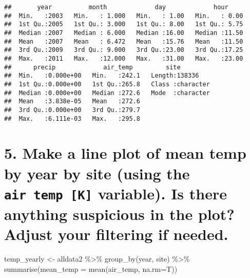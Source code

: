 \documentclass[
]{book}
\newenvironment{Shaded}{\begin{snugshade}}{\end{snugshade}}
\newcommand{\AttributeTok}[1]{\textcolor[rgb]{0.77,0.63,0.00}{#1}}
\newcommand{\FunctionTok}[1]{\textcolor[rgb]{0.00,0.00,0.00}{#1}}
\newcommand{\NormalTok}[1]{#1}
\newcommand{\OtherTok}[1]{\textcolor[rgb]{0.56,0.35,0.01}{#1}}
\newcommand{\SpecialCharTok}[1]{\textcolor[rgb]{0.00,0.00,0.00}{#1}}
\newcommand{\StringTok}[1]{\textcolor[rgb]{0.31,0.60,0.02}{#1}}
\begin{document}
\begin{verbatim}
##       year          month             day             hour      
##  Min.   :2003   Min.   : 1.000   Min.   : 1.00   Min.   : 0.00  
##  1st Qu.:2005   1st Qu.: 3.000   1st Qu.: 8.00   1st Qu.: 5.75  
##  Median :2007   Median : 6.000   Median :16.00   Median :11.50  
##  Mean   :2007   Mean   : 6.472   Mean   :15.76   Mean   :11.50  
##  3rd Qu.:2009   3rd Qu.: 9.000   3rd Qu.:23.00   3rd Qu.:17.25  
##  Max.   :2011   Max.   :12.000   Max.   :31.00   Max.   :23.00  
##      precip             air_temp         site          
##  Min.   :0.000e+00   Min.   :242.1   Length:138336     
##  1st Qu.:0.000e+00   1st Qu.:265.8   Class :character  
##  Median :0.000e+00   Median :272.6   Mode  :character  
##  Mean   :3.838e-05   Mean   :272.6                     
##  3rd Qu.:0.000e+00   3rd Qu.:279.7                     
##  Max.   :6.111e-03   Max.   :295.8
\end{verbatim}

\hypertarget{make-a-line-plot-of-mean-temp-by-year-by-site-using-the-air-temp-k-variable.-is-there-anything-suspicious-in-the-plot-adjust-your-filtering-if-needed.}{%
\section{\texorpdfstring{5. Make a line plot of mean temp by year by site (using the \texttt{air\ temp\ {[}K{]}} variable). Is there anything suspicious in the plot? Adjust your filtering if needed.}{5. Make a line plot of mean temp by year by site (using the air temp {[}K{]} variable). Is there anything suspicious in the plot? Adjust your filtering if needed.}}\label{make-a-line-plot-of-mean-temp-by-year-by-site-using-the-air-temp-k-variable.-is-there-anything-suspicious-in-the-plot-adjust-your-filtering-if-needed.}}

\begin{Shaded}
\begin{Highlighting}[]
\NormalTok{temp\_yearly }\OtherTok{\textless{}{-}}\NormalTok{ alldata2 }\SpecialCharTok{\%\textgreater{}\%} 
\FunctionTok{group\_by}\NormalTok{(year, site) }\SpecialCharTok{\%\textgreater{}\%}
\FunctionTok{summarise}\NormalTok{(}\AttributeTok{mean\_temp =} \FunctionTok{mean}\NormalTok{(}\StringTok{\textasciigrave{}}\AttributeTok{air\_temp}\StringTok{\textasciigrave{}}\NormalTok{, }\AttributeTok{na.rm=}\NormalTok{T))}
\end{Highlighting}
\end{Shaded}
\end{document}

